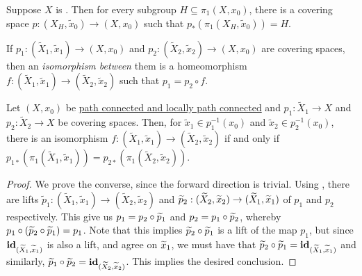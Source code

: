 \begin{theorem}
    Suppose $X$ is \nice. Then for every subgroup $H\subseteq\pi_1(X,x_0)$, there is a covering space $p: (X_H,\widetilde x_0)\to (X,x_0)$  such that $p_*(\pi_1(X_H,\widetilde{x}_0)) = H$.
\end{theorem}

If $p_1: (\widetilde X_1,\widetilde x_1)\to(X,x_0)$ and $p_2:(\widetilde X_2,\widetilde x_2)\to(X,x_0)$ are covering spaces, then an \textit{isomorphism between} them is a homeomorphism $f: (\widetilde X_1,\widetilde x_1)\to(\widetilde X_2,\widetilde x_2)$ such that $p_1 = p_2\circ f$.

\begin{theorem}
    Let $(X, x_0)$ be \ul{path connected and locally path connected} and $p_1:\widetilde X_1\to X$ and $p_2:\widetilde X_2\to X$ be covering spaces. Then, for $\widetilde x_1\in p_1^{-1}(x_0)$ and $\widetilde x_2\in p_2^{-1}(x_0)$, there is an isomorphism $f: (\widetilde X_1,\widetilde x_1)\to(\widetilde X_2,\widetilde x_2)$ if and only if $p_{1*}(\pi_1(\widetilde X_1,\widetilde x_1)) = p_{2*}(\pi_1(\widetilde{X}_2, \widetilde x_2))$.
\end{theorem}
\begin{proof}
    We prove the converse, since the forward direction is trivial. Using , there are lifts $\widetilde p_1: (\widetilde X_1,\widetilde x_1)\to(\widetilde X_2,\widetilde x_2)$ and $\widetilde{p}_2: (\widetilde{X}_2,\widetilde{x}_2)\to(\widetilde{X}_1,\widetilde{x}_1)$ of $p_1$ and $p_2$ respectively. This give us $p_1 = p_2\circ\widetilde{p}_1$ and $p_2 = p_1\circ\widetilde{p}_2$, whereby $p_1\circ(\widetilde{p}_2\circ\widetilde{p}_1) = p_1$. Note that this implies $\widetilde{p}_2\circ\widetilde{p}_1$ is a lift of the map $p_1$, but since $\mathbf{id}_{(\widetilde{X}_1,\widetilde{x}_1)}$ is also a lift, and agree on $\widetilde{x}_1$, we must have that $\widetilde{p}_2\circ\widetilde{p}_1 = \mathbf{id}_{(\widetilde{X}_1, \widetilde{x}_1)}$ and similarly, $\widetilde{p}_1\circ\widetilde{p}_2 = \mathbf{id}_{(\widetilde{X}_2,\widetilde{x}_2)}$. This implies the desired conclusion.
\end{proof}

